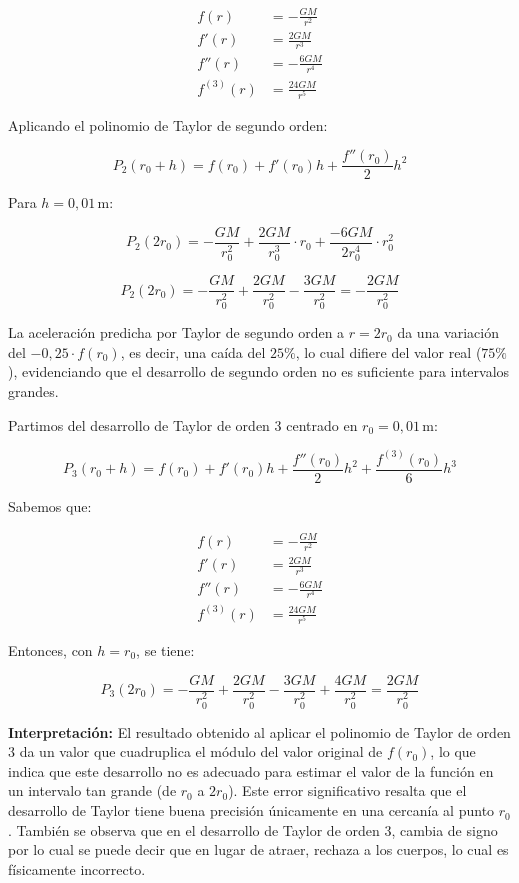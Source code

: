 \documentclass{article}
\begin{document}
\begin{align*}
f(r) &= -\frac{GM}{r^2} \\
f'(r) &= \frac{2GM}{r^3} \\
f''(r) &= -\frac{6GM}{r^4} \\
f^{(3)}(r) &= \frac{24GM}{r^5}
\end{align*}

Aplicando el polinomio de Taylor de segundo orden:

\[
P_2(r_0 + h) = f(r_0) + f'(r_0)h + \frac{f''(r_0)}{2}h^2
\]

Para $h = 0{,}01\,\text{m}$:

\[
P_2(2r_0) = -\frac{GM}{r_0^2} + \frac{2GM}{r_0^3} \cdot r_0 + \frac{-6GM}{2r_0^4} \cdot r_0^2
\]

\[
P_2(2r_0) = -\frac{GM}{r_0^2} + \frac{2GM}{r_0^2} - \frac{3GM}{r_0^2} = -\frac{2GM}{r_0^2}
\]

La aceleración predicha por Taylor de segundo orden a $r = 2r_0$ da una variación del $-0{,}25 \cdot f(r_0)$, es decir, una caída del $25\%$, lo cual difiere del valor real ($75\%$), evidenciando que el desarrollo de segundo orden no es suficiente para intervalos grandes.

Partimos del desarrollo de Taylor de orden 3 centrado en \( r_0 = 0{,}01\,\text{m} \):

\[
P_3(r_0 + h) = f(r_0) + f'(r_0) h + \frac{f''(r_0)}{2} h^2 + \frac{f^{(3)}(r_0)}{6} h^3
\]

Sabemos que:

\begin{align*}
f(r) &= -\frac{GM}{r^2} \\
f'(r) &= \frac{2GM}{r^3} \\
f''(r) &= -\frac{6GM}{r^4} \\
f^{(3)}(r) &= \frac{24GM}{r^5}
\end{align*}

Entonces, con \( h = r_0 \), se tiene:

\[
P_3(2r_0) = -\frac{GM}{r_0^2} + \frac{2GM}{r_0^2} - \frac{3GM}{r_0^2} + \frac{4GM}{r_0^2} = \frac{2GM}{r_0^2}
\]

\textbf{Interpretación:} El resultado obtenido al aplicar el polinomio de Taylor de orden 3 da un valor que cuadruplica el módulo del valor original de \( f(r_0) \), lo que indica que este desarrollo no es adecuado para estimar el valor de la función en un intervalo tan grande (de \( r_0 \) a \( 2r_0 \)). Este error significativo resalta que el desarrollo de Taylor tiene buena precisión únicamente en una cercanía al punto \( r_0 \).
También se observa que en el desarrollo de Taylor de orden 3, cambia de signo por lo cual se puede decir que en lugar de atraer, rechaza a los cuerpos, lo cual es físicamente incorrecto.
\end{document}

